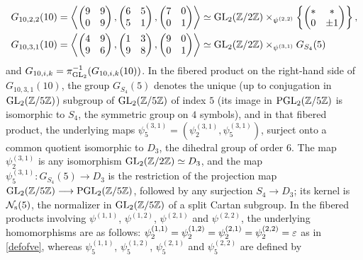 \begin{equation}
\begin{split}
G_{10,2,2}(10) &= \left\langle \begin{pmatrix} 9 & 9 \\ 0 & 9 \end{pmatrix}, \begin{pmatrix} 6 & 5 \\ 5 & 1 \end{pmatrix}, \begin{pmatrix} 7 & 0 \\ 0 & 1 \end{pmatrix} \right\rangle \simeq \operatorname{GL}_2(\mathbb{Z}/2\mathbb{Z}) \times_{\psi^{(2,2)}} \left\{ \begin{pmatrix} * & * \\ 0 & \pm 1 \end{pmatrix} \right\}, \\
G_{10,3,1}(10) &= \left\langle \begin{pmatrix} 4 & 9 \\ 9 & 6 \end{pmatrix}, \begin{pmatrix} 1 & 3 \\ 9 & 8 \end{pmatrix}, \begin{pmatrix} 9 & 0 \\ 0 & 1 \end{pmatrix} \right\rangle \simeq \operatorname{GL}_2(\mathbb{Z}/2\mathbb{Z}) \times_{\psi^{(3,1)}} G_{S_4}(5)
\end{split}
\end{equation}
and $G_{10,i,k} = \pi_{\operatorname{GL}_2}^{-1}(G_{10,i,k}(10))$. In the fibered product on the right-hand side of $G_{10,3,1}(10)$, the group $G_{S_4}(5)$ denotes the unique (up to conjugation in $\operatorname{GL}_2(\mathbb{Z}/5\mathbb{Z})$) subgroup of $\operatorname{GL}_2(\mathbb{Z}/5\mathbb{Z})$ of index $5$ (its image in $\operatorname{PGL}_2(\mathbb{Z}/5\mathbb{Z})$ is isomorphic to $S_4$, the symmetric group on $4$ symbols), and in that fibered product, the underlying maps $\psi_5^{(3,1)} = (\psi_2^{(3,1)},\psi_5^{(3,1)})$, surject onto a common quotient isomorphic to $D_3$, the dihedral group of order $6$. The map $\psi_2^{(3,1)}$ is any isomorphism $\operatorname{GL}_2(\mathbb{Z}/2\mathbb{Z}) \simeq D_3$, and the map $\psi_5^{(3,1)} : G_{S_4}(5) \longrightarrow D_3$ is the restriction of the projection map $\operatorname{GL}_2(\mathbb{Z}/5\mathbb{Z}) \longrightarrow \operatorname{PGL}_2(\mathbb{Z}/5\mathbb{Z})$, followed by any surjection $S_4 \longrightarrow D_3$; its kernel is $\mathcal{N}_{\operatorname{s}}(5)$, the normalizer in $\operatorname{GL}_2(\mathbb{Z}/5\mathbb{Z})$ of a split Cartan subgroup. In the fibered products involving $\psi^{(1,1)}$, $\psi^{(1,2)}$, $\psi^{(2,1)}$ and $\psi^{(2,2)}$, the underlying homomorphisms are as follows: $\psi_2^{(1,1)} = \psi_2^{(1,2)} = \psi_2^{(2,1)} = \psi_2^{(2,2)} = \varepsilon$ as in \eqref{defofve}, whereas $\psi_5^{(1,1)}$, $\psi_5^{(1,2)}$, $\psi_5^{(2,1)}$ and $\psi_5^{(2,2)}$ are defined by
